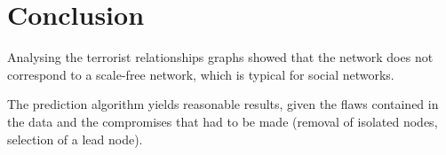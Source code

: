 \section{Conclusion}
\label{sec:Conclusion}
Analysing the terrorist relationships graphs showed that the network does not correspond to a scale-free network, which is typical for social networks.

The prediction algorithm yields reasonable results, given the flaws contained in the data and the compromises that had to be made (removal of isolated nodes, selection of a lead node).

